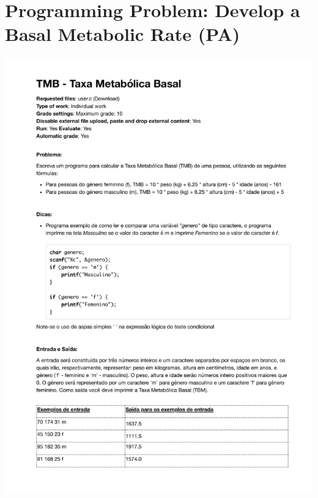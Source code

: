 \section{Programming Problem: Develop a Basal Metabolic Rate (PA)}
\label{annex:first-study-pA}
\includegraphics[page=1,width=1\textwidth]{images/annex/first-study-pA.pdf}

\newpage
